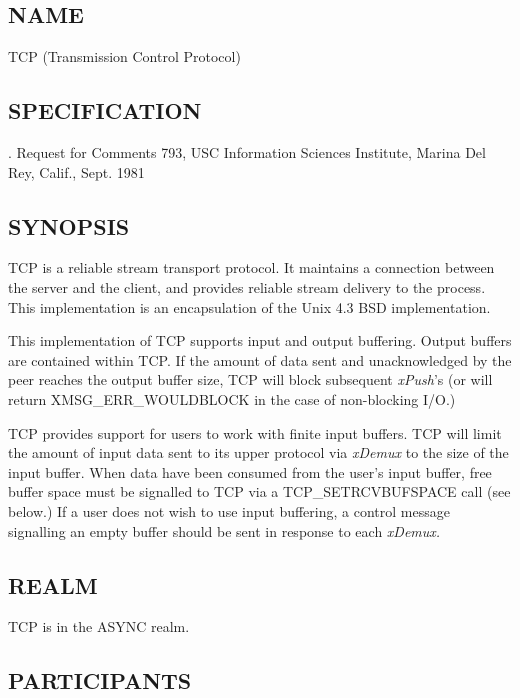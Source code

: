 %
%
%

\subsection*{NAME}

\noindent TCP (Transmission Control Protocol)

\subsection*{SPECIFICATION}

. Request for Comments
793, USC Information Sciences Institute, Marina Del Rey, Calif., Sept. 1981

\subsection*{SYNOPSIS}

\noindent TCP is a reliable stream transport protocol. It maintains
a connection between the server and the client, and provides reliable
stream delivery to the process. This implementation is an encapsulation
of the Unix 4.3 BSD implementation.

This implementation of TCP supports input and output buffering.
Output buffers are contained within TCP.  If the amount of data sent
and unacknowledged by the peer reaches the output buffer size, TCP
will block subsequent {\em xPush}'s (or will return
XMSG\_ERR\_WOULDBLOCK in the case of non-blocking I/O.)

TCP provides support for users to work with finite input buffers.  TCP
will limit the amount of input data sent to its upper protocol via
{\em xDemux} to the size of the input buffer.  When data have been
consumed from the user's input buffer, free buffer space must be
signalled to TCP via a TCP\_SETRCVBUFSPACE call (see below.)  If a
user does not wish to use input buffering, a control message
signalling an empty buffer should be sent in response to each {\em
xDemux.} 


\subsection*{REALM}

TCP is in the ASYNC realm.

\subsection*{PARTICIPANTS}

